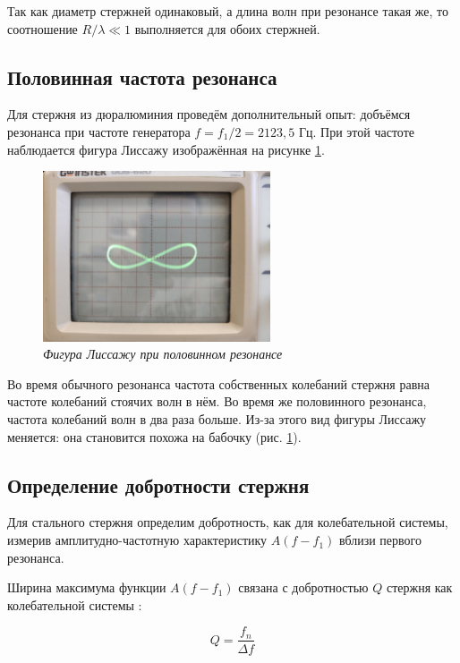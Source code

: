 \documentclass[a4paper,12pt]{article}
\begin{document}
Так как диаметр стержней одинаковый, а длина волн при резонансе такая же, то соотношение $R/\lambda \ll 1$ выполняется для обоих стержней. 

\subsection{Половинная частота резонанса}

Для стержня из дюралюминия проведём дополнительный опыт: добъёмся резонанса при частоте генератора $f = f_1 / 2 = 2123,5$ Гц. При этой частоте наблюдается фигура Лиссажу изображённая на рисунке \ref{butterfly}.

\begin{figure}[h!]
        \centering
	\includegraphics[width=0.6\textwidth]{butterfly.jpg}
	\caption{\textit{Фигура Лиссажу при половинном резонансе}}
	\label{butterfly}
\end{figure}

Во время обычного резонанса частота собственных колебаний стержня равна частоте колебаний стоячих волн в нём. Во время же половинного резонанса, частота колебаний волн в два раза больше. Из-за этого вид фигуры Лиссажу меняется: она становится похожа на бабочку (рис. \ref{butterfly}).

\subsection{Определение добротности стержня}

Для стального стержня определим добротность, как для колебательной системы, измерив амплитудно-частотную характеристику $A(f - f_1)$ вблизи первого резонанса. 

Ширина максимума функции $A(f - f_1)$ связана с добротностью $Q$ стержня как колебательной системы :

\begin{equation}\label{q}
    Q = \frac{f_n}{\Delta f}
\end{equation}
\end{document}
